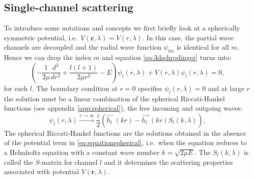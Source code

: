\documentclass[mathpazo]{cicp}
\begin{document}
\subsection{Single-channel scattering}
\label{sphericalsymmetry}
To introduce some notations and concepts we first briefly look at a spherically symmetric potential, i.e.\ $V(\mathbold{r},\lambda) = V(r,\lambda)$. In this case, the partial wave channels are decoupled and the radial wave function $\psi_{lm}$ is identical for all $m$. Hence we can drop the index $m$ and equation \eqref{eq:3dschrodinger} turns into:
\begin{equation}
	\label{eq:equationspherical}
	\left(-\frac{1}{2\mu} \frac{d^2}{d r^2} + \frac{l(l+1)}{2\mu r^2} - E \right) \psi_{l}(r,\lambda) + V(r,\lambda) \psi_{l}(r, \lambda) = 0,
\end{equation}
for each $l$. The boundary condition at $r=0$ specifies $\psi_{l}(r,\lambda) = 0$ and at large $r$ the solution must be a linear combination of the spherical Riccati-Hankel functions (see appendix \ref{app:spherical}), the free incoming and outgoing waves:
\begin{equation}
	\label{eq:sphericalboundary}
	\psi_{l}(r, \lambda) \xrightarrow{r\to\infty} \frac{i}{2} \left( \hat{h}^{-}_{l}(kr) - \hat{h}^{+}_{l}(kr) S_{l}(k, \lambda) \right),
\end{equation}
The spherical Riccati-Hankel functions are the solutions obtained in the absence of the potential term in \eqref{eq:equationspherical}, i.e.\ when the equation reduces to a Helmholtz equation with a constant wave number $k=\sqrt{2\mu E}$. The $S_{l}(k, \lambda)$ is called the $S$-matrix for channel $l$ and it determines the scattering properties associated with potential $V(\mathbold{r},\lambda)$.
\end{document}
